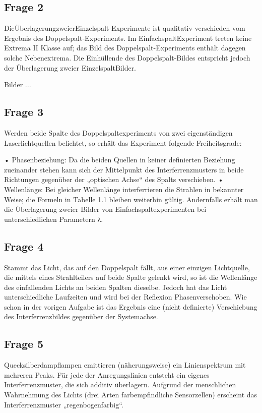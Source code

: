 \documentclass[a4paper,10pt]{scrartcl}
\begin{document}
		\subsection{Frage 2}
		DieÜberlagerungzweierEinzelspalt-Experimente ist qualitativ verschieden vom Ergebnis des Doppelspalt-Experiments. Im EinfachspaltExperiment treten keine Extrema II Klasse auf; das Bild des Doppelspalt-Experiments enthält dagegen solche Nebenextrema. Die Einhüllende des Doppelspalt-Bildes entspricht jedoch der Überlagerung zweier EinzelspaltBilder.

Bilder ...
		\subsection{Frage 3}
		Werden beide Spalte des Doppelspaltexperiments von zwei eigenständigen Laserlichtquellen belichtet, so erhält das Experiment folgende Freiheitsgrade:
		
		• Phasenbeziehung: Da die beiden Quellen in keiner deﬁnierten Beziehung zueinander stehen kann sich der Mittelpunkt des Interferrenzmusters in beide Richtungen gegenüber der „optischen Achse“ des Spalts verschieben. • Wellenlänge: Bei gleicher Wellenlänge interferrieren die Strahlen in bekannter Weise; die Formeln in Tabelle 1.1 bleiben weiterhin gültig. Andernfalls erhält man die Überlagerung zweier Bilder von Einfachspaltexperimenten bei unterschiedlichen Parametern λ.

		\subsection{Frage 4}
		Stammt das Licht, das auf den Doppelspalt fällt, aus einer einzigen Lichtquelle, die mittels eines Strahlteilers auf beide Spalte gelenkt wird, so ist die Wellenlänge des einfallenden Lichts an beiden Spalten dieselbe. Jedoch hat das Licht unterschiedliche Laufzeiten und wird bei der Reﬂexion Phasenverschoben. Wie schon in der vorigen Aufgabe ist das Ergebnis eine (nicht deﬁnierte) Verschiebung des Interferrenzbildes gegenüber der Systemachse.

		\subsection{Frage 5}
		Quecksilberdampﬂampen emittieren (näherungsweise) ein Linienspektrum mit mehreren Peaks. Für jede der Anregungslinien entsteht ein eigenes Interferrenzmuster, die sich additiv überlagern. Aufgrund der menschlichen Wahrnehmung des Lichts (drei Arten farbempﬁndliche Sensorzellen) erscheint das Interferrenzmuster „regenbogenfarbig“.
\end{document}
